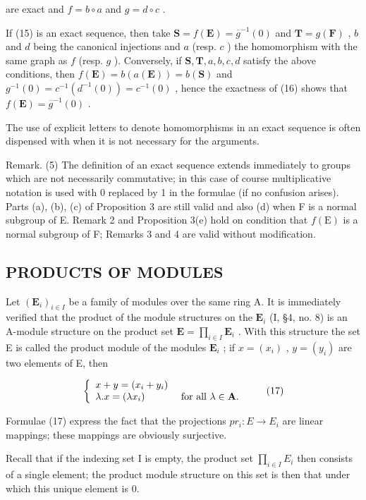 are exact and \(f = b \circ a\) and \(g = d \circ c\) .

If (15) is an exact sequence, then take \(\mathbf{S} = f(\mathbf{E}) = \overline{g}^{-1}(0)\) and \(\mathbf{T} = g(\mathbf{F})\) , \(b\) and \(d\) being the canonical injections and \(a\) (resp. \(c\) ) the homomorphism with the same graph as \(f\) (resp. \(g\) ). Conversely, if \(\mathbf{S}, \mathbf{T}, a, b, c, d\) satisfy the above conditions, then \(f(\mathbf{E}) = b(a(\mathbf{E})) = b(\mathbf{S})\) and \(g^{-1}(0) = c^{-1}(d^{-1}(0)) = c^{-1}(0)\) , hence the exactness of (16) shows that \(f(\mathbf{E}) = \overline{g}^{-1}(0)\) .

The use of explicit letters to denote homomorphisms in an exact sequence is often dispensed with when it is not necessary for the arguments.

Remark. (5) The definition of an exact sequence extends immediately to groups which are not necessarily commutative; in this case of course multiplicative notation is used with 0 replaced by 1 in the formulae (if no confusion arises). Parts (a), (b), (c) of Proposition 3 are still valid and also (d) when F is a normal subgroup of E. Remark 2 and Proposition 3(e) hold on condition that \(f(\mathrm{E})\) is a normal subgroup of F; Remarks 3 and 4 are valid without modification.

\subsection{PRODUCTS OF MODULES}

Let \((\mathbf{E}_i)_{i\in I}\) be a family of modules over the same ring A. It is immediately verified that the product of the module structures on the \(\mathbf{E}_i\) (I, §4, no. 8) is an A-module structure on the product set \(\mathbf{E} = \prod_{i\in I}\mathbf{E}_i\) . With this structure the set E is called the product module of the modules \(\mathbf{E}_i\) ; if \(x = (x_i)\) , \(y = (y_i)\) are two elements of E, then

\[
\left\{ \begin{array}{l l} x + y = (x _ {i} + y _ {i}) \\ \lambda . x = (\lambda x _ {i}) & \text { for   all } \lambda \in \mathbf {A}. \end{array} \right.\tag{17}
\]

Formulae (17) express the fact that the projections \(pr_{i}:E\to E_{i}\) are linear mappings; these mappings are obviously surjective.

Recall that if the indexing set I is empty, the product set \(\prod_{i\in I}E_{i}\) then consists of a single element; the product module structure on this set is then that under which this unique element is 0.

